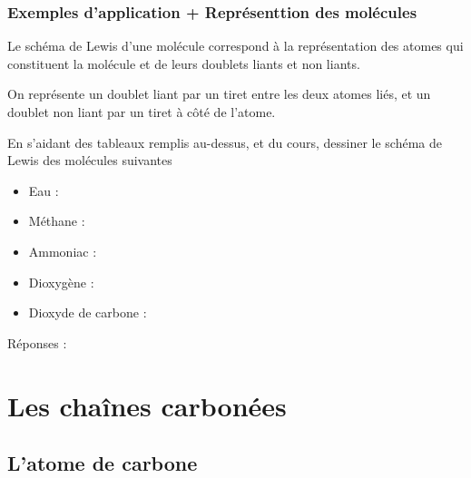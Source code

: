 \documentclass{article}
\begin{document}
\subsubsection{Exemples d'application + Représenttion des molécules}

Le schéma de Lewis d’une molécule correspond à la représentation des atomes qui constituent la molécule et de leurs doublets liants et non liants. \par
\vspace{1em}
On représente un doublet liant par un tiret entre les deux atomes liés, et un doublet non liant par un tiret à côté de l’atome. \par
\vspace{1em}
En s'aidant des tableaux remplis au-dessus, et du cours, dessiner le schéma de Lewis des molécules suivantes 

\begin{itemize}[noitemsep]
  \item Eau : 
  \item Méthane : 
  \item Ammoniac : 
  \item Dioxygène : 
  \item Dioxyde de carbone : 
\end{itemize}

Réponses : 

\vspace{7em}


\section{Les chaînes carbonées}

\subsection{L'atome de carbone}
\end{document}
